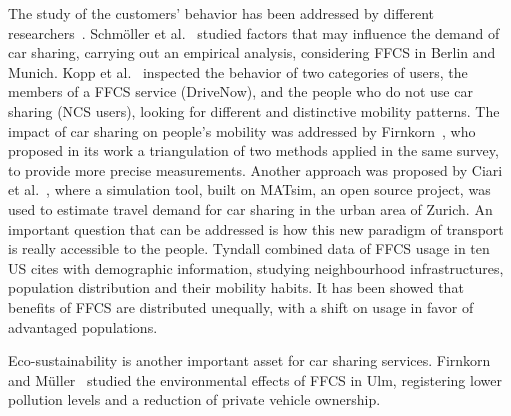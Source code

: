 The study of the customers' behavior has been addressed by different researchers~\cite{Schmoller2015,Kopp2015,Firnkorn2012,Ciari2013,Tyndall2016}. 
Schmöller et al.~\cite{Schmoller2015} studied factors that may influence the demand of car sharing, carrying out an empirical analysis, considering FFCS in Berlin and Munich.
Kopp et al.~\cite{Kopp2015} inspected the behavior of two categories of users, the members of a FFCS service (DriveNow), and the people who do not use car sharing (NCS users), looking for different and distinctive mobility patterns.
The impact of car sharing on people's mobility was addressed by Firnkorn~\cite{Firnkorn2012}, who proposed in its work a triangulation of two methods applied in the same survey, to provide more precise measurements.
Another approach was proposed by Ciari et al.~\cite{Ciari2013}, where a simulation tool, built on MATsim, an open source project, was used to estimate travel demand for car sharing in the urban area of Zurich.
An important question that can be addressed is how this new paradigm of transport is really accessible to the people. Tyndall \cite{Tyndall2016} combined data of FFCS usage in ten US cites with demographic information, studying neighbourhood infrastructures, population distribution and their mobility habits. It has been showed that  benefits of FFCS are distributed unequally, with a shift on usage in favor of advantaged populations.

Eco-sustainability is another important asset for car sharing services. Firnkorn and Müller~\cite{Firnkorn2011} studied the environmental effects of FFCS in Ulm, registering lower pollution levels and a reduction of private vehicle ownership.

